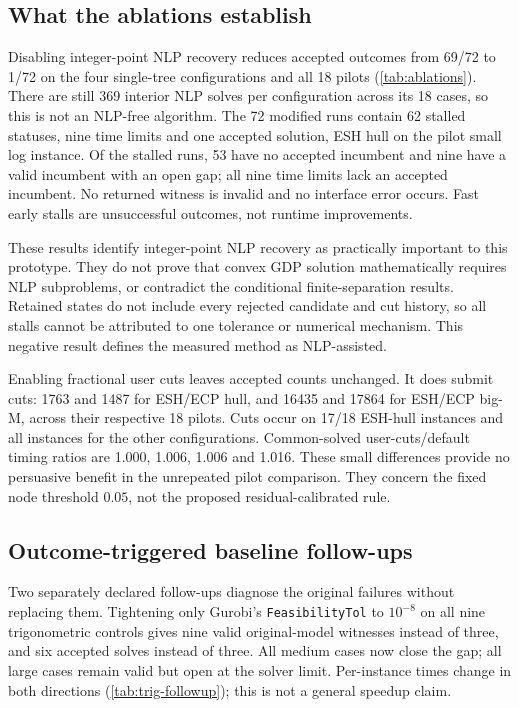 \subsection{What the ablations establish}\label{sec:ablations}
Disabling integer-point NLP recovery reduces accepted outcomes from 69/72 to 1/72 on the four single-tree configurations and all 18 pilots (\cref{tab:ablations}). There are still 369 interior NLP solves per configuration across its 18 cases, so this is not an NLP-free algorithm. The 72 modified runs contain 62 stalled statuses, nine time limits and one accepted solution, ESH hull on the pilot small log instance. Of the stalled runs, 53 have no accepted incumbent and nine have a valid incumbent with an open gap; all nine time limits lack an accepted incumbent. No returned witness is invalid and no interface error occurs. Fast early stalls are unsuccessful outcomes, not runtime improvements.

These results identify integer-point NLP recovery as practically important to this prototype. They do not prove that convex GDP solution mathematically requires NLP subproblems, or contradict the conditional finite-separation results. Retained states do not include every rejected candidate and cut history, so all stalls cannot be attributed to one tolerance or numerical mechanism. This negative result defines the measured method as NLP-assisted.

Enabling fractional user cuts leaves accepted counts unchanged. It does submit cuts: 1763 and 1487 for ESH/ECP hull, and 16435 and 17864 for ESH/ECP big-M, across their respective 18 pilots. Cuts occur on 17/18 ESH-hull instances and all instances for the other configurations. Common-solved user-cuts/default timing ratios are 1.000, 1.006, 1.006 and 1.016. These small differences provide no persuasive benefit in the unrepeated pilot comparison. They concern the fixed node threshold $0.05$, not the proposed residual-calibrated rule.

\subsection{Outcome-triggered baseline follow-ups}\label{sec:followups}
Two separately declared follow-ups diagnose the original failures without replacing them. Tightening only Gurobi's \texttt{FeasibilityTol} to $10^{-8}$ on all nine trigonometric controls gives nine valid original-model witnesses instead of three, and six accepted solves instead of three. All medium cases now close the gap; all large cases remain valid but open at the solver limit. Per-instance times change in both directions (\cref{tab:trig-followup}); this is not a general speedup claim.

